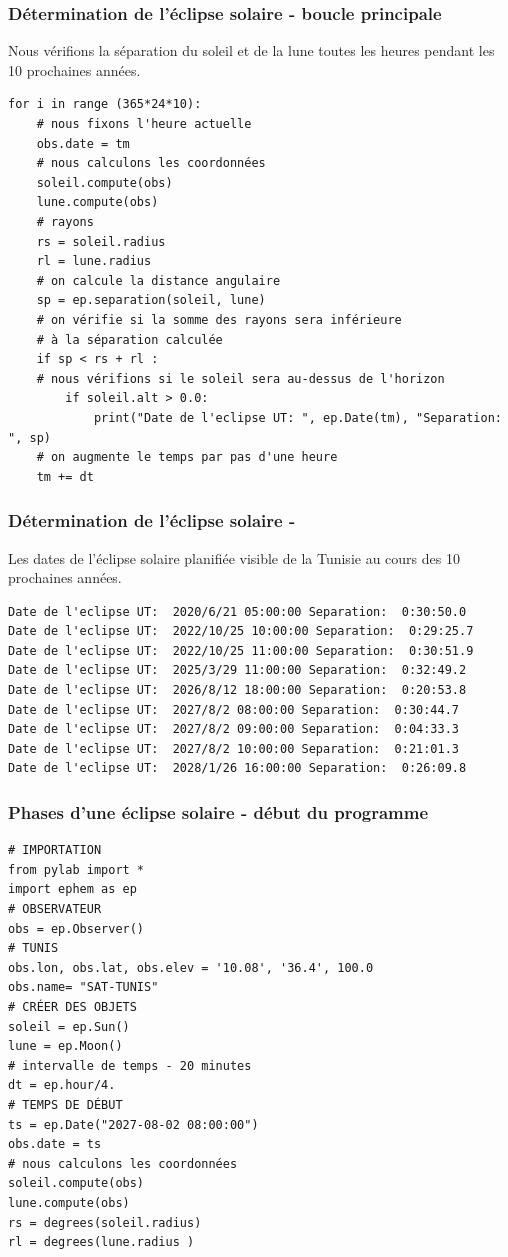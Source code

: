 \documentclass{beamer}
\begin{document}
\begin{frame}
\frametitle{Détermination de l'éclipse solaire - boucle principale}

Nous vérifions la séparation du soleil et de la lune toutes les heures pendant les 10 prochaines années.
\begin{verbatim}
for i in range (365*24*10):
    # nous fixons l'heure actuelle
    obs.date = tm
    # nous calculons les coordonnées
    soleil.compute(obs)
    lune.compute(obs)
    # rayons
    rs = soleil.radius
    rl = lune.radius
    # on calcule la distance angulaire
    sp = ep.separation(soleil, lune)
    # on vérifie si la somme des rayons sera inférieure
    # à la séparation calculée
    if sp < rs + rl :
    # nous vérifions si le soleil sera au-dessus de l'horizon
        if soleil.alt > 0.0:
            print("Date de l'eclipse UT: ", ep.Date(tm), "Separation: ", sp)
    # on augmente le temps par pas d'une heure
    tm += dt
\end{verbatim}
\end{frame}

\begin{frame}
\frametitle{Détermination de l'éclipse solaire -}

Les dates de l'éclipse solaire planifiée visible de la Tunisie au cours des 10 prochaines années.
\begin{Verbatim}[numbers=none,fontsize=\fontsize{9pt}{9pt},baselinestretch=0.95]
Date de l'eclipse UT:  2020/6/21 05:00:00 Separation:  0:30:50.0
Date de l'eclipse UT:  2022/10/25 10:00:00 Separation:  0:29:25.7
Date de l'eclipse UT:  2022/10/25 11:00:00 Separation:  0:30:51.9
Date de l'eclipse UT:  2025/3/29 11:00:00 Separation:  0:32:49.2
Date de l'eclipse UT:  2026/8/12 18:00:00 Separation:  0:20:53.8
Date de l'eclipse UT:  2027/8/2 08:00:00 Separation:  0:30:44.7
Date de l'eclipse UT:  2027/8/2 09:00:00 Separation:  0:04:33.3
Date de l'eclipse UT:  2027/8/2 10:00:00 Separation:  0:21:01.3
Date de l'eclipse UT:  2028/1/26 16:00:00 Separation:  0:26:09.8
\end{Verbatim}
\end{frame}

\begin{frame}
\frametitle{Phases d'une éclipse solaire - début du programme}

\begin{verbatim}
# IMPORTATION
from pylab import *
import ephem as ep
# OBSERVATEUR
obs = ep.Observer()
# TUNIS
obs.lon, obs.lat, obs.elev = '10.08', '36.4', 100.0
obs.name= "SAT-TUNIS"
# CRÉER DES OBJETS
soleil = ep.Sun()
lune = ep.Moon()
# intervalle de temps - 20 minutes
dt = ep.hour/4.
# TEMPS DE DÉBUT
ts = ep.Date("2027-08-02 08:00:00")
obs.date = ts
# nous calculons les coordonnées
soleil.compute(obs)
lune.compute(obs)
rs = degrees(soleil.radius)
rl = degrees(lune.radius )
\end{verbatim}
\end{frame}
\end{document}
